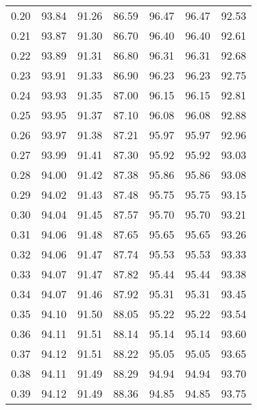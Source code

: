 \begin{tabular}{|c|c|c|c|c|c|c|}
      0.20 &     93.84 &     91.26 &      86.59 &   96.47 &      96.47 &         92.53 \\
      0.21 &     93.87 &     91.30 &      86.70 &   96.40 &      96.40 &         92.61 \\
      0.22 &     93.89 &     91.31 &      86.80 &   96.31 &      96.31 &         92.68 \\
      0.23 &     93.91 &     91.33 &      86.90 &   96.23 &      96.23 &         92.75 \\
      0.24 &     93.93 &     91.35 &      87.00 &   96.15 &      96.15 &         92.81 \\
      0.25 &     93.95 &     91.37 &      87.10 &   96.08 &      96.08 &         92.88 \\
      0.26 &     93.97 &     91.38 &      87.21 &   95.97 &      95.97 &         92.96 \\
      0.27 &     93.99 &     91.41 &      87.30 &   95.92 &      95.92 &         93.03 \\
      0.28 &     94.00 &     91.42 &      87.38 &   95.86 &      95.86 &         93.08 \\
      0.29 &     94.02 &     91.43 &      87.48 &   95.75 &      95.75 &         93.15 \\
      0.30 &     94.04 &     91.45 &      87.57 &   95.70 &      95.70 &         93.21 \\
      0.31 &     94.06 &     91.48 &      87.65 &   95.65 &      95.65 &         93.26 \\
      0.32 &     94.06 &     91.47 &      87.74 &   95.53 &      95.53 &         93.33 \\
      0.33 &     94.07 &     91.47 &      87.82 &   95.44 &      95.44 &         93.38 \\
      0.34 &     94.07 &     91.46 &      87.92 &   95.31 &      95.31 &         93.45 \\
      0.35 &     94.10 &     91.50 &      88.05 &   95.22 &      95.22 &         93.54 \\
      0.36 &     94.11 &     91.51 &      88.14 &   95.14 &      95.14 &         93.60 \\
      0.37 &     94.12 &     91.51 &      88.22 &   95.05 &      95.05 &         93.65 \\
      0.38 &     94.11 &     91.49 &      88.29 &   94.94 &      94.94 &         93.70 \\
      0.39 &     94.12 &     91.49 &      88.36 &   94.85 &      94.85 &         93.75 \\

\end{tabular}
